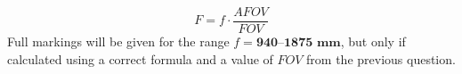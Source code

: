 \[
F = f \cdot \frac{AFOV}{FOV}
\]
Full markings will be given for the range $f = \textbf{940--1875 mm}$, but
only if calculated using a correct formula and a value of $FOV$ from the
previous question.
